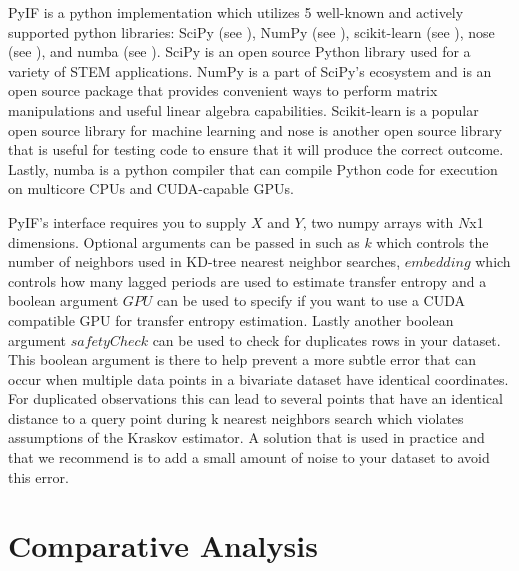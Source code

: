 
PyIF is a python implementation which utilizes 5 well-known and actively supported python libraries: SciPy (see \cite{scipy}),  NumPy (see \cite{numpy}), scikit-learn (see \cite{scikit-learn}),  nose (see \cite{nose}), and numba (see \cite{numba}).  SciPy is an open source Python library used for a variety of STEM applications.  NumPy  is a part of SciPy's ecosystem and is an open source package that provides convenient ways to perform matrix manipulations and useful linear algebra capabilities.  Scikit-learn is a popular open source library for machine learning and nose is another open source library that is useful for testing code to ensure that it will produce the correct outcome.  Lastly, numba is a python compiler that can compile Python code for execution on multicore CPUs and CUDA-capable GPUs.

PyIF's  interface requires you to supply \(X\) and \(Y\), two numpy arrays with \(N\)x1 dimensions.  Optional arguments can be passed in such as \(k\) which controls the number of neighbors used in KD-tree nearest neighbor searches,  \(embedding\) which controls how many lagged periods are used to estimate transfer entropy and a boolean argument \(GPU\) can be used to specify if you want to use a CUDA compatible GPU for transfer entropy estimation.  Lastly another boolean argument \(safetyCheck\) can be used to check for duplicates rows in your dataset. This boolean argument is there to help prevent a more subtle error that can occur when multiple data points in a bivariate dataset have identical coordinates. For duplicated observations this can lead to several points that have an identical distance to a query point during k nearest neighbors search which violates assumptions of the Kraskov estimator. A solution that is used in practice and that we recommend is to add a small amount of noise to your dataset to avoid this error.

\section{Comparative Analysis} \label{PyIF:CA}

